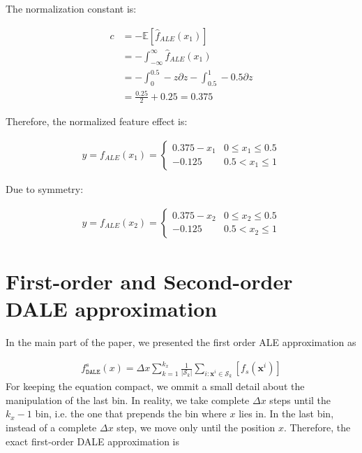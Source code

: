 \documentclass[runningheads, envcountsame, a4paper]{llncs}
\newcommand{\xb}{\mathbf{x}}
\begin{document}
The normalization constant is:

\begin{equation}
  \label{eq:constant}
  \begin{split}
    c & = - \mathbb{E}[\hat{f}_{ALE}(x_1)] \\
    & = - \int_{-\infty}^{\infty} \hat{f}_{ALE}(x_1) \\
    & = - \int_{0}^{0.5} - z \partial z - \int_{0.5}^{1} -0.5 \partial z \\
    & = \frac{0.25}{2} + 0.25 = 0.375
  \end{split}
\end{equation}

Therefore, the normalized feature effect is:

\begin{gather}
y = f_{ALE}(x_1) =
\begin{cases}
0.375 - x_1 & 0 \leq x_1 \leq 0.5\\
- 0.125 &  0.5 < x_1 \leq 1
\end{cases}
\end{gather}

Due to symmetry:

\begin{gather}
y = f_{ALE}(x_2) =
\begin{cases}
0.375 - x_2 & 0 \leq x_2 \leq 0.5\\
- 0.125 &  0.5 < x_2 \leq 1
\end{cases}
\end{gather}

\section{First-order and Second-order DALE approximation}

In the main part of the paper, we presented the first order ALE approximation as

\begin{align}
  f_{\mathtt{DALE}}^s(x) = \Delta x \sum_{k=1}^{k_x} \frac{1}{|\mathcal{S}_k|}
  \sum_{i:\xb^i \in \mathcal{S}_k} [f_s(\xb^i)]
\end{align}
%
For keeping the equation compact, we ommit a small detail about the
manipulation of the last bin. In reality, we take complete
\( \Delta x \) steps until the \( k_x - 1 \) bin, i.e. the one that
prepends the bin where \( x \) lies in. In the last bin, instead of a
complete \( \Delta x \) step, we move only until the position \( x
\). Therefore, the exact first-order DALE approximation is
\end{document}
